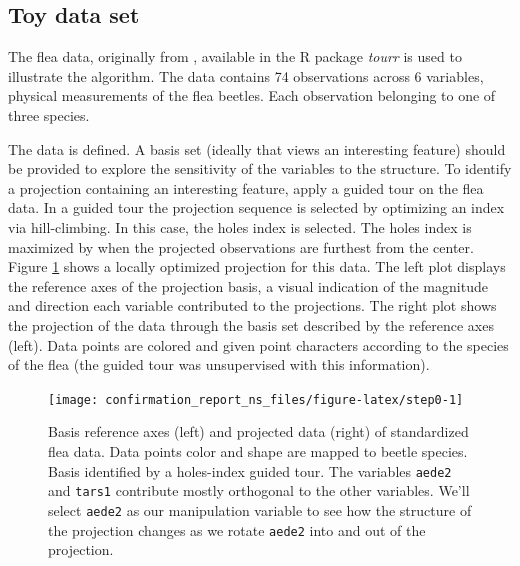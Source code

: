 \documentclass{monashthesis}
\theoremstyle{definition}
\theoremstyle{definition}
\theoremstyle{definition}
\theoremstyle{remark}
\begin{document}
\subsection{Toy data set}\label{toy-data-set}

The flea data, originally from \textcite{lubischew_use_1962}, available
in the R package \emph{tourr} \autocite{wickham_tourr_2011} is used to
illustrate the algorithm. The data contains 74 observations across 6
variables, physical measurements of the flea beetles. Each observation
belonging to one of three species.

The data is defined. A basis set (ideally that views an interesting
feature) should be provided to explore the sensitivity of the variables
to the structure. To identify a projection containing an interesting
feature, apply a guided tour\autocite{cook_interactive_2007} on the flea
data. In a guided tour the projection sequence is selected by optimizing
an index via hill-climbing. In this case, the holes index is selected.
The holes index is maximized by when the projected observations are
furthest from the center. Figure \ref{fig:step0} shows a locally
optimized projection for this data. The left plot displays the reference
axes of the projection basis, a visual indication of the magnitude and
direction each variable contributed to the projections. The right plot
shows the projection of the data through the basis set described by the
reference axes (left). Data points are colored and given point
characters according to the species of the flea (the guided tour was
unsupervised with this information).









\begin{figure}

{\centering \texttt{[image: confirmation\_report\_ns\_files/figure-latex/step0-1]} 

}

\caption{Basis reference axes (left) and projected data (right)
of standardized flea data. Data points color and shape are mapped to
beetle species. Basis identified by a holes-index guided tour. The
variables \texttt{aede2} and \texttt{tars1} contribute mostly orthogonal
to the other variables. We'll select \texttt{aede2} as our manipulation
variable to see how the structure of the projection changes as we rotate
\texttt{aede2} into and out of the projection.}\label{fig:step0}
\end{figure}
\end{document}
